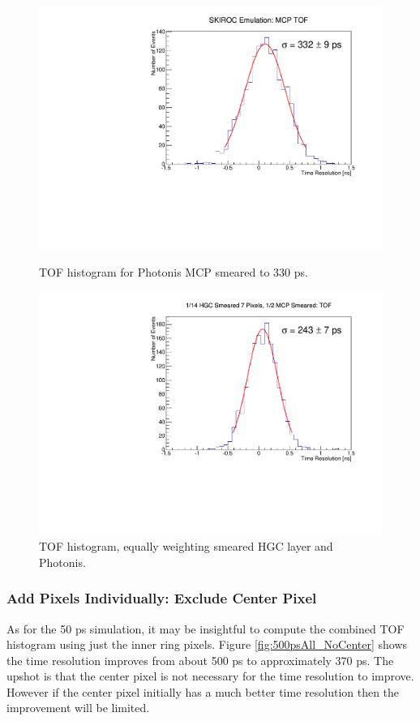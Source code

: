 \documentclass[12pt]{article}
\begin{document}
\begin{figure}[h]
\centering
\begin{minipage}[t]{0.49\textwidth}
	\includegraphics[width=\linewidth]{SKIROC/deltaTMCPSmear500.pdf}
	\caption{TOF histogram for Photonis MCP smeared to 330 ps.}
	\label{fig:500psMCP}
\end{minipage} \hfill
\begin{minipage}[t]{0.49\textwidth}
	\includegraphics[width=\linewidth]{SKIROC/deltaT_PicoSilEqual_MCP_Equal_BothSmear500.pdf}
	\caption{TOF histogram, equally weighting smeared HGC layer and Photonis.}
	\label{fig:500psHGCMCP}
\end{minipage}
\end{figure}

\subsubsection{Add Pixels Individually: Exclude Center Pixel}
As for the 50 ps simulation, it may be insightful to compute the combined TOF histogram using just the inner ring pixels.
Figure \ref{fig:500psAll_NoCenter} shows the time resolution improves from about 500 ps to approximately 370 ps. 
The upshot is that the center pixel is not necessary for the time resolution to improve.
However if the center pixel initially has a much better time resolution then the improvement will be limited.
\end{document}
